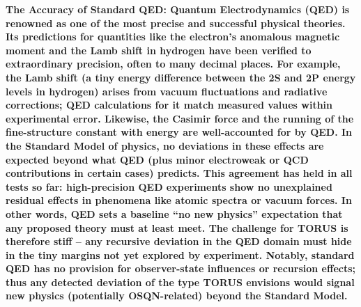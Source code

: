 \documentclass[]{article}
\begin{document}
\textbf{The Accuracy of Standard QED: Quantum Electrodynamics (QED) is
renowned as one of the most precise and successful physical theories.
Its predictions for quantities like the electron's anomalous magnetic
moment and the Lamb shift in hydrogen have been verified to
extraordinary precision, often to many decimal places. For example, the
Lamb shift (a tiny energy difference between the 2S and 2P energy levels
in hydrogen) arises from vacuum fluctuations and radiative corrections;
QED calculations for it match measured values within experimental error.
Likewise, the Casimir force and the running of the fine-structure
constant with energy are well-accounted for by QED. In the Standard
Model of physics, no deviations in these effects are expected beyond
what QED (plus minor electroweak or QCD contributions in certain cases)
predicts. This agreement has held in all tests so far: high-precision
QED experiments show no unexplained residual effects in phenomena like
atomic spectra or vacuum forces. In other words, QED sets a baseline
``no new physics'' expectation that any proposed theory must at least
meet. The challenge for TORUS is therefore stiff -- any recursive
deviation in the QED domain must hide in the tiny margins not yet
explored by experiment. Notably, standard QED has no provision for
observer-state influences or recursion effects; thus any detected
deviation of the type TORUS envisions would signal new physics
(potentially OSQN-related) beyond the Standard Model.}
\end{document}
